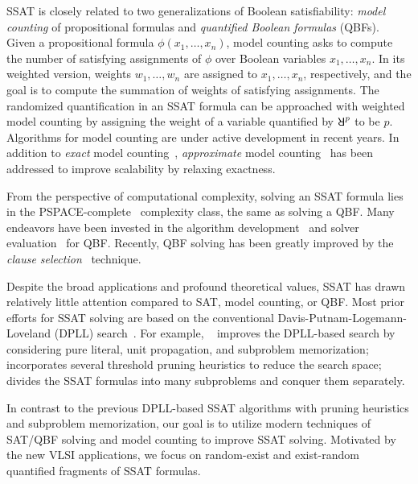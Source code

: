 SSAT is closely related to two generalizations of Boolean satisfiability:
\textit{model counting} of propositional formulas and \textit{quantified Boolean formulas} (QBFs).
Given a propositional formula $\phi(x_1,\ldots,x_n)$, model counting asks to compute the number of satisfying assignments of $\phi$ over Boolean variables $x_1,\ldots,x_n$.
In its weighted version, weights $w_1,\ldots,w_n$ are assigned to $x_1,\ldots,x_n$, respectively,
and the goal is to compute the summation of weights of satisfying assignments.
The randomized quantification in an SSAT formula can be approached with weighted model counting by assigning the weight of a variable quantified by $\random{p}$ to be $p$.
Algorithms for model counting are under active development in recent years.
In addition to \textit{exact} model counting~\cite{Sang2004,Sang2005ModelCounting},
\textit{approximate} model counting~\cite{Gomes2006,Gomes2007,Chakraborty2016} has been addressed to improve scalability by relaxing exactness.

From the perspective of computational complexity,
solving an SSAT formula lies in the PSPACE-complete~\cite{Stockmeyer1973} complexity class,
the same as solving a QBF.
Many endeavors have been invested in the algorithm development~\cite{SATHandbook-QBF} and solver evaluation~\cite{Narizzano2006} for QBF.
Recently, QBF solving has been greatly improved by the \textit{clause selection}~\cite{Janota2015,Rabe2015} technique.

Despite the broad applications and profound theoretical values,
SSAT has drawn relatively little attention compared to SAT, model counting, or QBF.
Most prior efforts for SSAT solving are based on the conventional Davis-Putnam-Logemann-Loveland (DPLL) search~\cite{Davis1962}.
For example, \maxplan~\cite{Majercik1998} improves the DPLL-based search by considering pure literal, unit propagation, and subproblem memorization;
\zander~\cite{Majercik2003} incorporates several threshold pruning heuristics to reduce the search space;
\dcssat~\cite{Majercik2005} divides the SSAT formulas into many subproblems and conquer them separately.


In contrast to the previous DPLL-based SSAT algorithms with pruning heuristics and subproblem memorization,
our goal is to utilize modern techniques of SAT/QBF solving and model counting to improve SSAT solving.
Motivated by the new VLSI applications, we focus on random-exist and exist-random quantified fragments of SSAT formulas.

